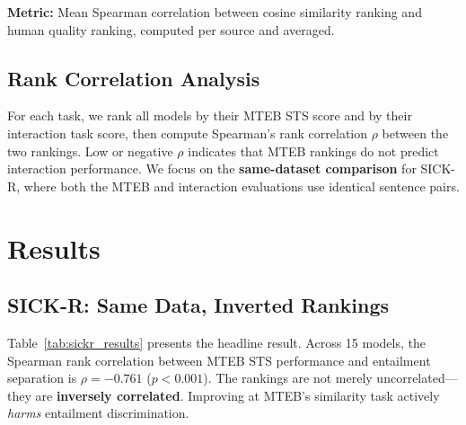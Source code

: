 \documentclass{article}
\begin{document}
\textbf{Metric:} Mean Spearman correlation between cosine similarity ranking and human quality ranking, computed per source and averaged.

\subsection{Rank Correlation Analysis}

For each task, we rank all models by their MTEB STS score and by their interaction task score, then compute Spearman's rank correlation $\rho$ between the two rankings. Low or negative $\rho$ indicates that MTEB rankings do not predict interaction performance. We focus on the \textbf{same-dataset comparison} for SICK-R, where both the MTEB and interaction evaluations use identical sentence pairs.

\section{Results}
\label{sec:results}

\subsection{SICK-R: Same Data, Inverted Rankings}

Table~\ref{tab:sickr_results} presents the headline result. Across 15 models, the Spearman rank correlation between MTEB STS performance and entailment separation is $\rho = -0.761$ ($p < 0.001$). The rankings are not merely uncorrelated---they are \textbf{inversely correlated}. Improving at MTEB's similarity task actively \emph{harms} entailment discrimination.
\end{document}
